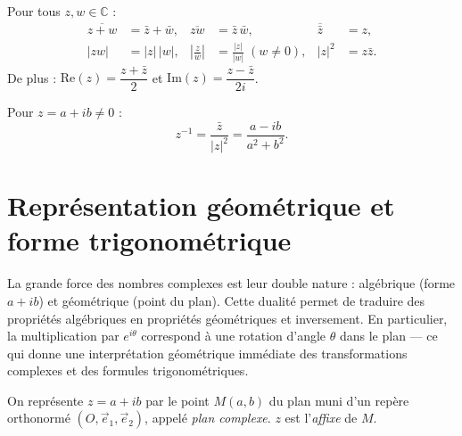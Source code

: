 \documentclass[11pt,a4paper,twoside]{book}
\newcommand{\C}{\mathbb{C}}
\begin{document}
\begin{theoremebox}
Pour tous $z, w \in \C$ :
\begin{align*}
  \overline{z+w} &= \bar{z}+\bar{w}, &\overline{zw} &= \bar{z}\,\bar{w}, &\overline{\bar{z}} &= z, \\
  |zw| &= |z|\,|w|, &\left|\tfrac{z}{w}\right| &= \tfrac{|z|}{|w|}\;(w\neq0), &|z|^2 &= z\bar{z}.
\end{align*}
De plus : $\mathrm{Re}(z) = \dfrac{z+\bar{z}}{2}$ et $\mathrm{Im}(z) = \dfrac{z-\bar{z}}{2i}$.
\end{theoremebox}

\begin{definitionbox}
Pour $z = a+ib \neq 0$ :
\[
  z^{-1} = \frac{\bar{z}}{|z|^2} = \frac{a - ib}{a^2+b^2}.
\]
\end{definitionbox}

\section{Représentation géométrique et forme trigonométrique}

La grande force des nombres complexes est leur double nature : algébrique (forme $a+ib$) et géométrique (point du plan). Cette dualité permet de traduire des propriétés algébriques en propriétés géométriques et inversement. En particulier, la multiplication par $e^{i\theta}$ correspond à une rotation d'angle $\theta$ dans le plan — ce qui donne une interprétation géométrique immédiate des transformations complexes et des formules trigonométriques.

\begin{definitionbox}
On représente $z = a+ib$ par le point $M(a,b)$ du plan muni d'un repère orthonormé
$(O,\vec{e}_1,\vec{e}_2)$, appelé \emph{plan complexe}. $z$ est l'\emph{affixe} de $M$.
\end{definitionbox}

\begin{center}
\end{center}
\end{document}
